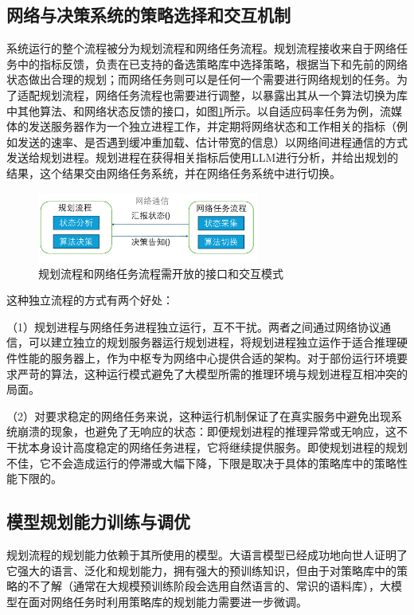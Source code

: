 \subsection{网络与决策系统的策略选择和交互机制}
系统运行的整个流程被分为规划流程和网络任务流程。规划流程接收来自于网络任务中的指标反馈，负责在已支持的备选策略库中选择策略，根据当下和先前的网络状态做出合理的规划；而网络任务则可以是任何一个需要进行网络规划的任务。为了适配规划流程，网络任务流程也需要进行调整，以暴露出其从一个算法切换为库中其他算法、和网络状态反馈的接口，如图\ref{fig_llmcc_api}所示。以自适应码率任务为例，流媒体的发送服务器作为一个独立进程工作，并定期将网络状态和工作相关的指标（例如发送的速率、是否遇到缓冲重加载、估计带宽的信息）以网络间进程通信的方式发送给规划进程。规划进程在获得相关指标后使用LLM进行分析，并给出规划的结果，这个结果交由网络任务系统，并在网络任务系统中进行切换。

\begin{figure} [ht]
\centering
\includegraphics[width=0.65\textwidth]{figures/chap04/API.pdf} 
\caption{规划流程和网络任务流程需开放的接口和交互模式}
\label{fig_llmcc_api}
\end{figure}


这种独立流程的方式有两个好处：

（1）规划进程与网络任务进程独立运行，互不干扰。两者之间通过网络协议通信，可以建立独立的规划服务器运行规划进程，将规划进程独立运作于适合推理硬件性能的服务器上，作为中枢专为网络中心提供合适的架构。对于部份运行环境要求严苛的算法，这种运行模式避免了大模型所需的推理环境与规划进程互相冲突的局面。

（2）对要求稳定的网络任务来说，这种运行机制保证了在真实服务中避免出现系统崩溃的现象，也避免了无响应的状态：即便规划进程的推理异常或无响应，这不干扰本身设计高度稳定的网络任务进程，它将继续提供服务。即使规划进程的规划不佳，它不会造成运行的停滞或大幅下降，下限是取决于具体的策略库中的策略性能下限的。

\subsection{模型规划能力训练与调优}
规划流程的规划能力依赖于其所使用的模型。大语言模型已经成功地向世人证明了它强大的语言、泛化和规划能力，拥有强大的预训练知识，但由于对策略库中的策略的不了解（通常在大规模预训练阶段会选用自然语言的、常识的语料库），大模型在面对网络任务时利用策略库的规划能力需要进一步微调。

